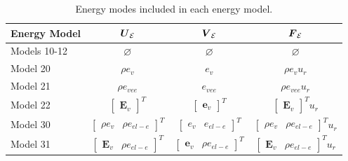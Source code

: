 \documentclass[10pt]{article}
\begin{document}
\begin{flushleft}
\begin{table}[h!]
\centering
\begin{tabular}{lccc}
\toprule
\textbf{Energy Model} & $\boldsymbol{U}_{\mathcal{E}}$ & $\boldsymbol{V}_{\mathcal{E}}$ & $\boldsymbol{F}_{\mathcal{E}}$   \\
\midrule
Models 10-12 & $\varnothing$ & $\varnothing$ & $\varnothing$  \\
Model 20 & $\rho e_v$ & $e_v$ & $\rho e_v u_r$   \\
Model 21 & $\rho e_{vee}$ & $e_{vee}$ & $\rho e_{vee} u_r$  \\
Model 22 & $\begin{bmatrix} \boldsymbol{E}_v \end{bmatrix}^T$ & $\begin{bmatrix} \boldsymbol{e}_v \end{bmatrix}^T$ &  $ \begin{bmatrix} \boldsymbol{E}_v \end{bmatrix}^T u_r$ \\
Model 30 & $\begin{bmatrix} \rho e_v & \rho e_{el-e} \end{bmatrix}^T$ & $\begin{bmatrix} e_v & e_{el-e} \end{bmatrix}^T$ & $\begin{bmatrix} \rho e_v & \rho e_{el-e} \end{bmatrix}^T u_r$  \\
Model 31 & $\begin{bmatrix} \boldsymbol{E}_v & \rho e_{el-e} \end{bmatrix}^T$ & $\begin{bmatrix} \boldsymbol{e}_v & \rho e_{el-e} \end{bmatrix}^T$ & $\begin{bmatrix} \boldsymbol{E}_v & \rho e_{el-e} \end{bmatrix}^T u_r$  \\
\bottomrule
\end{tabular}
\caption{Energy modes included in each energy model.}
\label{tab:UV-Energy-Components}
\end{table}



\end{flushleft}
\end{document}
